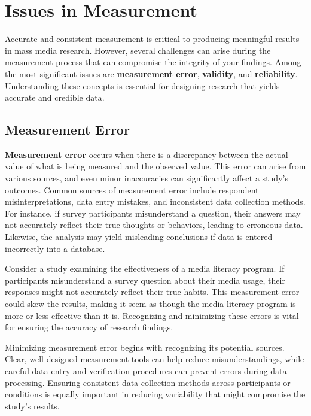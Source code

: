 \documentclass[
]{book}
\begin{document}
\section{Issues in Measurement}\label{issues-in-measurement}

Accurate and consistent measurement is critical to producing meaningful results in mass media research. However, several challenges can arise during the measurement process that can compromise the integrity of your findings. Among the most significant issues are \textbf{measurement error}, \textbf{validity}, and \textbf{reliability}. Understanding these concepts is essential for designing research that yields accurate and credible data.

\subsection*{Measurement Error}\label{measurement-error}

\textbf{Measurement error} occurs when there is a discrepancy between the actual value of what is being measured and the observed value. This error can arise from various sources, and even minor inaccuracies can significantly affect a study's outcomes. Common sources of measurement error include respondent misinterpretations, data entry mistakes, and inconsistent data collection methods. For instance, if survey participants misunderstand a question, their answers may not accurately reflect their true thoughts or behaviors, leading to erroneous data. Likewise, the analysis may yield misleading conclusions if data is entered incorrectly into a database.

Consider a study examining the effectiveness of a media literacy program. If participants misunderstand a survey question about their media usage, their responses might not accurately reflect their true habits. This measurement error could skew the results, making it seem as though the media literacy program is more or less effective than it is. Recognizing and minimizing these errors is vital for ensuring the accuracy of research findings.

Minimizing measurement error begins with recognizing its potential sources. Clear, well-designed measurement tools can help reduce misunderstandings, while careful data entry and verification procedures can prevent errors during data processing. Ensuring consistent data collection methods across participants or conditions is equally important in reducing variability that might compromise the study's results.
\end{document}
